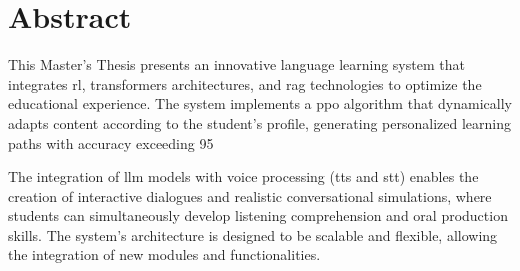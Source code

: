 \chapter*{Abstract}
\label{abstract}


This Master's Thesis presents an innovative language learning system that integrates \gls{rl}, \gls{transformers} architectures, and \gls{rag} technologies to optimize the educational experience. The system implements a \gls{ppo} algorithm that dynamically adapts content according to the student's profile, generating personalized learning paths with accuracy exceeding 95%

The integration of \gls{llm} models with voice processing (\gls{tts} and \gls{stt}) enables the creation of interactive dialogues and realistic conversational simulations, where students can simultaneously develop listening comprehension and oral production skills. The system's architecture is designed to be scalable and flexible, allowing the integration of new modules and functionalities.